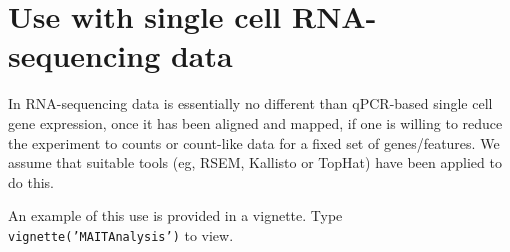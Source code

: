 \documentclass{article}\usepackage[]{graphicx}\usepackage[usenames,dvipsnames]{color}
\begin{document}
\section{Use with single cell RNA-sequencing data}
In RNA-sequencing data is essentially no different than qPCR-based single cell gene expression, once it has been aligned and mapped, if one is willing to reduce the experiment to counts or count-like data for a fixed set of genes/features.  
We assume that suitable tools (eg, RSEM, Kallisto or TopHat) have been applied to do this.

An example of this use is provided in a vignette.  Type \texttt{vignette('MAITAnalysis')} to view.
\begin{comment}
  \section{Implementation Details}
  Here we provide some background on the implementation of the
  package.

  There are several fundamental new object types provided by the
  package.  \texttt{SummarizedExperiment} is the base class, which is
  provides an array-like object to store tabular data that might have
  multiple derived representations. 
  On construction of a \texttt{SingleCellAssay} object, the package
  tests for completeness, and will fill in the missing data (with NA)
  if it is not, so assays with lots of missing data can make reading
  marginally slower.
\end{comment}
\end{document}
